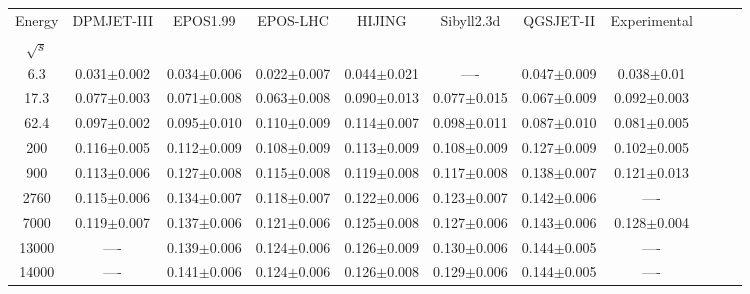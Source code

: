 \begin{table*}[!htb]
{\begin{center}
\begin{tabular}{ccccccccccc}
 \small Energy&\small DPMJET-III&\small EPOS1.99 &\small EPOS-LHC  &\small HIJING &\small Sibyll2.3d&\small QGSJET-II &\small Experimental  \\
 $\sqrt{s}$  &      &   &    &   & & \\
\hline
    \small 6.3  & \small 0.031$\pm$0.002 &\small 0.034$\pm$0.006 &\small 0.022$\pm$0.007 &\small 0.044$\pm$0.021 &\small ---- &\small 0.047$\pm$0.009&\small 0.038$\pm$0.01
 \\
    \small 17.3 &\small 0.077$\pm$0.003&\small 0.071$\pm$0.008&\small 0.063$\pm$0.008 &\small 0.090$\pm$0.013 &\small 0.077$\pm$0.015 &\small 0.067$\pm$0.009 &\small 0.092$\pm$0.003
\\
    \small 62.4 &\small 0.097$\pm$0.002&\small 0.095$\pm$0.010 &\small 0.110$\pm$0.009 &\small 0.114$\pm$0.007&\small 0.098$\pm$0.011 &\small 0.087$\pm$0.010 &\small 0.081$\pm$0.005\\
    \small 200 &\small  0.116$\pm$0.005 &\small 0.112$\pm$0.009 &\small 0.108$\pm$0.009&\small 0.113$\pm$0.009 &\small 0.108$\pm$0.009 &\small 0.127$\pm$0.009 &\small 0.102$\pm$0.005
\\
    \small 900 &\small0.113$\pm$0.006&\small 0.127$\pm$0.008 &\small 0.115$\pm$0.008 &\small 0.119$\pm$0.008 &\small 0.117$\pm$0.008 &\small 0.138$\pm$0.007 &\small 0.121$\pm$0.013
\\
    \small 2760 &\small 0.115$\pm$0.006 &\small 0.134$\pm$0.007 &\small 0.118$\pm$0.007 &\small 0.122$\pm$0.006 &\small  0.123$\pm$0.007 &\small 0.142$\pm$0.006 &\small ----\\
    \small 7000 &\small 0.119$\pm$0.007 &\small 0.137$\pm$0.006 &\small 0.121$\pm$0.006 &\small 0.125$\pm$0.008&\small 0.127$\pm$0.006&\small 0.143$\pm$0.006 &\small 0.128$\pm$0.004\\
    \small 13000 &\small ---- &\small 0.139$\pm$0.006 &\small 0.124$\pm$0.006 &\small 0.126$\pm$0.009 &\small 0.130$\pm$0.006 &\small 0.144$\pm$0.005&\small----\\
    \small 14000 &\small---- &\small0.141$\pm$0.006 &\small0.124$\pm$0.006 &\small 0.126$\pm$0.008
 &\small 0.129$\pm$0.006&\small 0.144$\pm$0.005&\small----\\
\hline
\end{tabular}%
\end{center}}
\end{table*}

%

